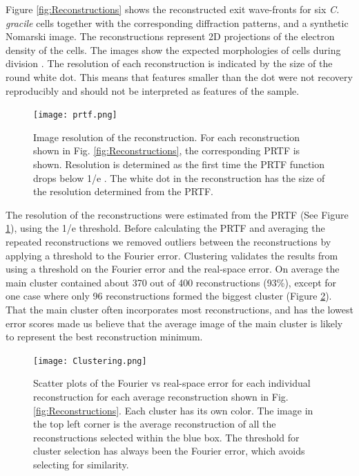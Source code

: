 Figure \ref{fig:Reconstructions} shows the reconstructed exit wave-fronts for six \textit{C. gracile} cells together with the corresponding diffraction patterns, and a synthetic Nomarski image. The reconstructions represent 2D projections of the electron density of the cells. The images show the expected morphologies of cells during division \cite{Komarek1999,Bazire1988}. The resolution of each reconstruction is indicated by the size of the round white dot. This means that features smaller than the dot were not recovery reproducibly and should not be interpreted as features of the sample.

\begin{figure}[!ht]
	\centering 
		\texttt{[image: prtf.png]}
	\caption{Image resolution of the reconstruction. For each reconstruction shown in Fig. \ref{fig:Reconstructions}, the corresponding PRTF is shown. Resolution is determined as the first time the PRTF function drops below 1/e \cite{Seibert2011}. The white dot in the reconstruction has the size of the resolution determined from the PRTF.}
	\label{fig:PRTF}
\end{figure}

The resolution of the reconstructions were estimated from the PRTF (See Figure \ref{fig:PRTF}), using the 1/e threshold. Before calculating the PRTF and averaging the repeated reconstructions we removed outliers between the reconstructions by applying a threshold to the Fourier error. Clustering validates the results from using a threshold on the Fourier error and the real-space error. On average the main cluster contained about 370 out of 400 reconstructions (93\%), except for one case where only 96 reconstructions formed the biggest cluster (Figure \ref{fig:Clustering}). That the main cluster often incorporates most reconstructions, and has the lowest error scores made us believe that the average image of the main cluster is likely to represent the best reconstruction minimum. 

\begin{figure}[!ht]
	\centering 
		\texttt{[image: Clustering.png]}
	\caption{Scatter plots of the Fourier vs real-space error for each individual reconstruction for each average reconstruction shown in Fig. \ref{fig:Reconstructions}. Each cluster has its own color. The image in the top left corner is the average reconstruction of all the reconstructions selected within the blue box. The threshold for cluster selection has always been the Fourier error, which avoids selecting for similarity. }
	\label{fig:Clustering}
\end{figure}

